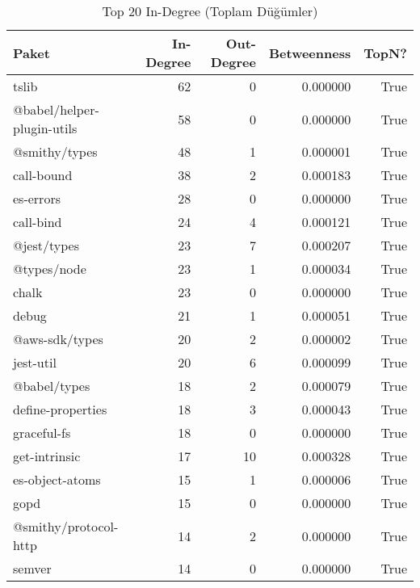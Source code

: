 \begin{table}[h]
\centering
\caption{Top 20 In-Degree (Toplam Düğümler)}
\begin{tabular}{lrrrr}
\toprule
Paket & In-Degree & Out-Degree & Betweenness & TopN? \\ \midrule
tslib & 62 & 0 & 0.000000 & True \\
@babel/helper-plugin-utils & 58 & 0 & 0.000000 & True \\
@smithy/types & 48 & 1 & 0.000001 & True \\
call-bound & 38 & 2 & 0.000183 & True \\
es-errors & 28 & 0 & 0.000000 & True \\
call-bind & 24 & 4 & 0.000121 & True \\
@jest/types & 23 & 7 & 0.000207 & True \\
@types/node & 23 & 1 & 0.000034 & True \\
chalk & 23 & 0 & 0.000000 & True \\
debug & 21 & 1 & 0.000051 & True \\
@aws-sdk/types & 20 & 2 & 0.000002 & True \\
jest-util & 20 & 6 & 0.000099 & True \\
@babel/types & 18 & 2 & 0.000079 & True \\
define-properties & 18 & 3 & 0.000043 & True \\
graceful-fs & 18 & 0 & 0.000000 & True \\
get-intrinsic & 17 & 10 & 0.000328 & True \\
es-object-atoms & 15 & 1 & 0.000006 & True \\
gopd & 15 & 0 & 0.000000 & True \\
@smithy/protocol-http & 14 & 2 & 0.000000 & True \\
semver & 14 & 0 & 0.000000 & True \\
\bottomrule
\end{tabular}
\end{table}
